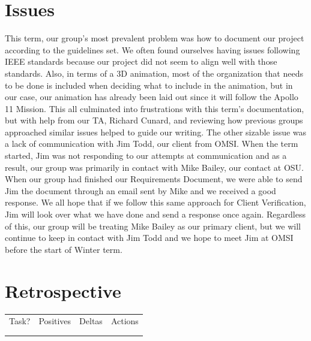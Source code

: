 \documentclass[onecolumn, draftclsnofoot,10pt, compsoc]{IEEEtran}
\begin{document}
\section{Issues}
This term, our group's most prevalent problem was how to document our project according to the guidelines set. We often found ourselves having issues following IEEE standards because our project did not seem to align well with those standards. Also, in terms of a 3D animation, most of the organization that needs to be done is included when deciding what to include in the animation, but in our case, our animation has already been laid out since it will follow the Apollo 11 Mission. This all culminated into frustrations with this term's documentation, but with help from our TA, Richard Cunard, and reviewing how previous groups approached similar issues helped to guide our writing. 
\newline
\newline
The other sizable issue was a lack of communication with Jim Todd, our client from OMSI. When the term started, Jim was not responding to our attempts at communication and as a result, our group was primarily in contact with Mike Bailey, our contact at OSU. When our group had finished our Requirements Document, we were able to send Jim the document through an email sent by Mike and we received a good response. We all hope that if we follow this same approach for Client Verification, Jim will look over what we have done and send a response once again. Regardless of this, our group will be treating Mike Bailey as our primary client, but we will continue to keep in contact with Jim Todd and we hope to meet Jim at OMSI before the start of Winter term. 

\section{Retrospective}

\begin{tabular}{|l|l|l|l|}
\hline
    Task? & Positives & Deltas & Actions  \\
     & & & \\
     & & & \\
    \hline
     
\end{tabular}
\end{document}
